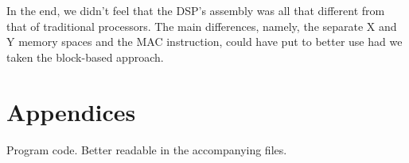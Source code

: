 \documentclass[10pt,a4paper,oneside]{article}
\newcommand{\mycin}[1]{%
  
}
\begin{document}
In the end, we didn't feel that the DSP's assembly was all that different from that of traditional processors. The main differences, namely, the separate X and Y memory spaces and the MAC instruction, could have put to better use had we taken the block-based approach.

\section{Appendices}

Program code. Better readable in the accompanying files.

\mycin{code/main.c}
\mycin{code/seq.c}
\mycin{code/seq.h}
\mycin{code/main.asm}
\mycin{code/oscinc.asm}
\mycin{code/filtinc.asm}
\mycin{code/multipoleinc.asm}
\mycin{code/adsrinc.asm}
\mycin{code/sininc.asm}
\mycin{code/sin_table.asm}
\mycin{code/instruparams.asm}
\mycin{code/dpw_coefs.asm}
\mycin{code/saw_ticks.asm}
\mycin{code/instrucode.asm}
\mycin{code/adsr.asm}
\mycin{code/osc.asm}
\mycin{code/filt.asm}
\mycin{code/multipole.asm}
\mycin{code/sin.asm}
\mycin{code/isr.asm}




\end{document}
